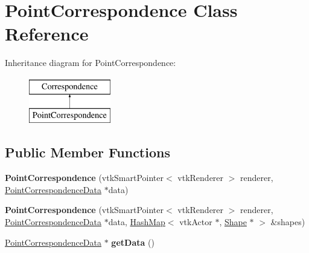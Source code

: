 \hypertarget{class_point_correspondence}{}\section{Point\+Correspondence Class Reference}
\label{class_point_correspondence}
Inheritance diagram for Point\+Correspondence\+:\begin{figure}[H]
\begin{center}
\leavevmode
\includegraphics[height=2.000000cm]{class_point_correspondence}
\end{center}
\end{figure}
\subsection*{Public Member Functions}
\begin{DoxyCompactItemize}
\item 
\hypertarget{class_point_correspondence_a4ae058435459065fad930bf6f5eeb355}{}{\bfseries Point\+Correspondence} (vtk\+Smart\+Pointer$<$ vtk\+Renderer $>$ renderer, \hyperlink{class_point_correspondence_data}{Point\+Correspondence\+Data} $\ast$data)\label{class_point_correspondence_a4ae058435459065fad930bf6f5eeb355}

\item 
\hypertarget{class_point_correspondence_a194d358a1a9cc838690359cbd5902a4b}{}{\bfseries Point\+Correspondence} (vtk\+Smart\+Pointer$<$ vtk\+Renderer $>$ renderer, \hyperlink{class_point_correspondence_data}{Point\+Correspondence\+Data} $\ast$data, \hyperlink{class_hash_map}{Hash\+Map}$<$ vtk\+Actor $\ast$, \hyperlink{class_shape}{Shape} $\ast$ $>$ \&shapes)\label{class_point_correspondence_a194d358a1a9cc838690359cbd5902a4b}

\item 
\hypertarget{class_point_correspondence_a2dc1d4de5d4bf8f9f10d909275eb4935}{}\hyperlink{class_point_correspondence_data}{Point\+Correspondence\+Data} $\ast$ {\bfseries get\+Data} ()\label{class_point_correspondence_a2dc1d4de5d4bf8f9f10d909275eb4935}

\end{DoxyCompactItemize}
